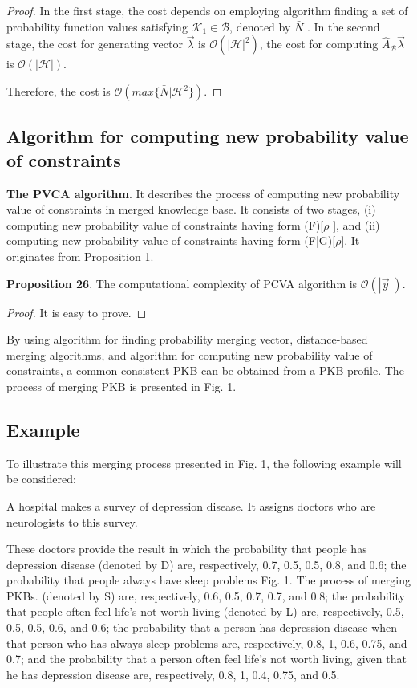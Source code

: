 \documentclass[]{iosart2c}
\begin{document}
    \begin{proof}
        In the first stage, the cost depends on employing algorithm finding a set of probability function
        values satisfying $\mathcal{K}_1 \in \mathcal{B}$, denoted by $\bar N$ . In the
        second stage, the cost for generating vector $\vec{\lambda}$ is
        $\mathcal{O}(|\mathcal{H}|^2)$, the cost for computing $\hat{A}_\mathcal{B}\vec{\lambda}$ is $\mathcal{O}(|\mathcal{H}|)$.

        Therefore, the cost is $\mathcal{O}(max\{\bar N|\mathcal{H}^2\})$.
    \end{proof}

    \subsection{Algorithm for computing new probability value of constraints}

    \textbf{The PVCA algorithm}. It describes the process of computing new probability value of constraints in merged knowledge base. It consists of two stages, (i) computing new probability value of constraints having form (F)[$\rho$ ], and (ii) computing new probability value of constraints having form (F|G)[$\rho$]. It originates from Proposition 1.

    \textbf{Proposition 26}. The computational complexity of PCVA algorithm is $\mathcal{O}(|\vec{y} |)$.

    \begin{proof}
        It is easy to prove.
    \end{proof}


    By using algorithm for finding probability merging vector, distance-based merging algorithms, and algorithm for computing new probability value of constraints, a common consistent PKB can be obtained from a PKB profile. The process of merging PKB is presented in Fig. 1.

    \subsection{Example}

    To illustrate this merging process presented in Fig. 1, the following example will be considered:

    A hospital makes a survey of depression disease. It assigns doctors who are neurologists to this survey.

    These doctors provide the result in which the probability that people has depression disease (denoted by D) are, respectively, 0.7, 0.5, 0.5, 0.8, and 0.6; the probability that people always have sleep problems Fig. 1. The process of merging PKBs.
    (denoted by S) are, respectively, 0.6, 0.5, 0.7, 0.7, and 0.8; the probability that people often feel life’s not worth living (denoted by L) are, respectively, 0.5, 0.5, 0.5, 0.6, and 0.6; the probability that a person has depression disease when that person who has always sleep problems are, respectively, 0.8, 1, 0.6, 0.75, and 0.7; and the probability that a person often feel life’s not worth living, given that he has depression disease are, respectively, 0.8, 1, 0.4, 0.75, and 0.5.
\end{document}
